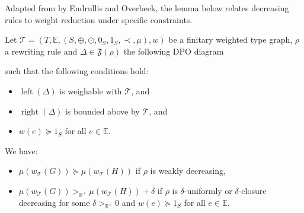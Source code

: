 Adapted from \cite[Theorem C.3]{endrullis2024generalized_arxiv_v2} by Endrullis and Overbeek, the lemma below relates decreasing rules to weight reduction under specific constraints. 
\begin{lemma}
    \label{nwf:lem:decreasing_step}
    Let $\mathcal{T} = (T,\mathbb{E}, (S, \oplus, \odot, 0_S, 1_S, \prec, \mu), w)$ be a finitary weighted type graph, $\rho$ a rewriting rule and $\Delta \in \mathfrak{F}(\rho)$ the following DPO diagram
    \begin{center}
      \end{center}
    such that the following conditions hold:
 
   \begin{itemize}
       \item $\operatorname{left}(\Delta)$ is weighable with \(\mathcal{T}\), and
       \item $\operatorname{right}(\Delta)$ is bounded above by \(\mathcal{T}\), and
       \item $w(e) \succeq 1_S$ for all $e \in \mathbb{E}$.
   \end{itemize}

   \noindent
  We have:
   \begin{itemize}
       \item $\mu(w_\mathcal{T}(G)) \succeq \mu(w_\mathcal{T}(H))$ if $\rho$ is weakly decreasing,
       \item $\mu(w_\mathcal{T}(G)) >_{\mathbb{R}^+} \mu(w_\mathcal{T}(H)) + \delta$ if $\rho$ is $\delta$-uniformly or $\delta$-closure decreasing for some $\delta >_{\mathbb{R}^+} 0$ and $w(e) \succeq 1_S$ for all $e \in \mathbb{E}$.
   \end{itemize}
\end{lemma} 

